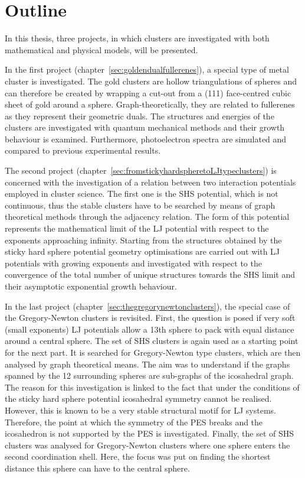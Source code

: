 \section{Outline}
\label{sec:Outline}

In this thesis, three projects, in which clusters are investigated with both
mathematical and physical models, will be presented.

In the first project (chapter~\ref{sec:goldendualfullerenes}), a special type of
metal cluster is investigated. The gold clusters are hollow triangulations of
spheres and can therefore be created by wrapping a cut-out from a (111)
face-centred cubic sheet of gold around a sphere. Graph-theoretically, they are
related to fullerenes as they represent their geometric duals. The structures
and energies of the clusters are investigated with quantum mechanical methods
and their growth behaviour is examined. Furthermore, photoelectron spectra are
simulated and compared to previous experimental results.

The second project (chapter~\ref{sec:fromstickyhardspheretoLJtypeclusters}) is
concerned with the investigation of a relation between two interaction
potentials employed in cluster science. The first one is the \ac{SHS} potential,
which is not continuous, thus the stable clusters have to be searched by means
of graph theoretical methods through the adjacency relation. The form of this
potential represents the mathematical limit of the \ac{LJ} potential with
respect to the exponents approaching infinity. Starting from the structures
obtained by the sticky hard sphere potential geometry optimisations are
carried out with \ac{LJ} potentials with growing exponents and investigated with
respect to the convergence of the total number of unique structures towards the
\ac{SHS} limit and their asymptotic exponential growth behaviour.

In the last project (chapter~\ref{sec:thegregorynewtonclusters}), the special
case of the Gregory-Newton clusters is revisited. First, the question is posed
if very soft (small exponents) \ac{LJ} potentials allow a 13th sphere to pack
with equal distance around a central sphere. The set of \ac{SHS} clusters is
again used as a starting point for the next part. It is searched for
Gregory-Newton type clusters, which are then analysed by graph theoretical
means. The aim was to understand if the graphs spanned by the 12 surrounding
spheres are sub-graphs of the icosahedral graph. The reason for this
investigation is linked to the fact that under the conditions of the sticky hard
sphere potential icosahedral symmetry cannot be realised. However, this is known
to be a very stable structural motif for \ac{LJ} systems. Therefore, the point
at which the symmetry of the \ac{PES} breaks and the icosahedron is not
supported by the \ac{PES} is investigated. Finally, the set of \ac{SHS} clusters
was analysed for Gregory-Newton clusters where one sphere enters the second
coordination shell. Here, the focus was put on finding the shortest distance
this sphere can have to the central sphere.



